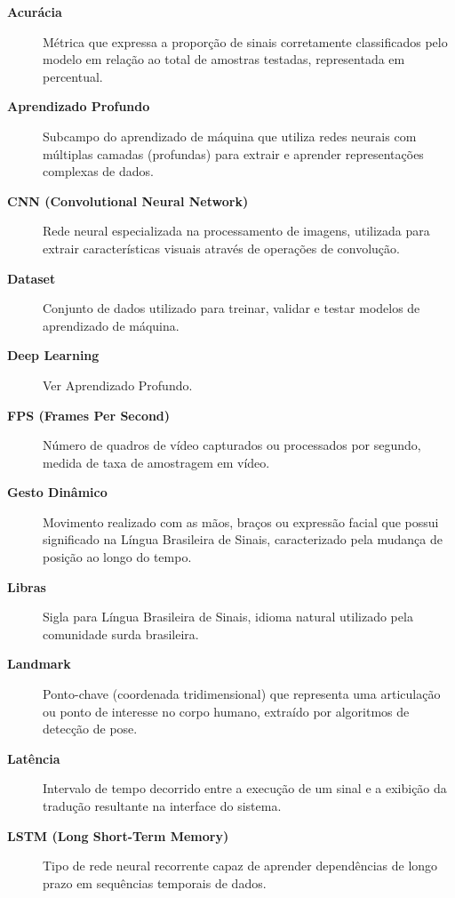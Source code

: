 \begin{description}
    \item[\textbf{Acurácia}] Métrica que expressa a proporção de sinais corretamente classificados pelo modelo em relação ao total de amostras testadas, representada em percentual.

    \item[\textbf{Aprendizado Profundo}] Subcampo do aprendizado de máquina que utiliza redes neurais com múltiplas camadas (profundas) para extrair e aprender representações complexas de dados.

    \item[\textbf{CNN (Convolutional Neural Network)}] Rede neural especializada na processamento de imagens, utilizada para extrair características visuais através de operações de convolução.

    \item[\textbf{Dataset}] Conjunto de dados utilizado para treinar, validar e testar modelos de aprendizado de máquina.

    \item[\textbf{Deep Learning}] Ver Aprendizado Profundo.

    \item[\textbf{FPS (Frames Per Second)}] Número de quadros de vídeo capturados ou processados por segundo, medida de taxa de amostragem em vídeo.

    \item[\textbf{Gesto Dinâmico}] Movimento realizado com as mãos, braços ou expressão facial que possui significado na Língua Brasileira de Sinais, caracterizado pela mudança de posição ao longo do tempo.

    \item[\textbf{Libras}] Sigla para Língua Brasileira de Sinais, idioma natural utilizado pela comunidade surda brasileira.

    \item[\textbf{Landmark}] Ponto-chave (coordenada tridimensional) que representa uma articulação ou ponto de interesse no corpo humano, extraído por algoritmos de detecção de pose.

    \item[\textbf{Latência}] Intervalo de tempo decorrido entre a execução de um sinal e a exibição da tradução resultante na interface do sistema.

    \item[\textbf{LSTM (Long Short-Term Memory)}] Tipo de rede neural recorrente capaz de aprender dependências de longo prazo em sequências temporais de dados.


\end{description}
